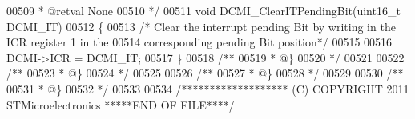 \begin{DoxyCode}
00509 \textcolor{comment}{  * @retval None}
00510 \textcolor{comment}{  */}
00511 \textcolor{keywordtype}{void} DCMI_ClearITPendingBit(uint16\_t DCMI\_IT)
00512 \{
00513   \textcolor{comment}{/* Clear the interrupt pending Bit by writing in the ICR register 1 in the }
00514 \textcolor{comment}{  corresponding pending Bit position*/}
00515 
00516   DCMI->ICR = DCMI\_IT;
00517 \}
00518 \textcolor{comment}{/**}
00519 \textcolor{comment}{  * @\}}
00520 \textcolor{comment}{  */}
00521 
00522 \textcolor{comment}{/**}
00523 \textcolor{comment}{  * @\}}
00524 \textcolor{comment}{  */}
00525 
00526 \textcolor{comment}{/**}
00527 \textcolor{comment}{  * @\}}
00528 \textcolor{comment}{  */}
00529 
00530 \textcolor{comment}{/**}
00531 \textcolor{comment}{  * @\}}
00532 \textcolor{comment}{  */}
00533 
00534 \textcolor{comment}{/******************* (C) COPYRIGHT 2011 STMicroelectronics *****END OF FILE****/}
\end{DoxyCode}
